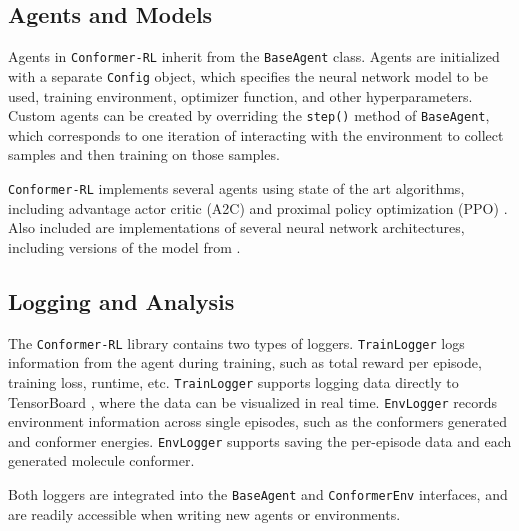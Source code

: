 \documentclass[twoside,11pt]{article}
\newcommand{\code}[1]{\texttt{#1}}
\newcommand{\titleofpaper}{Conformer-RL}
\newcommand{\genComment}[2]{\ifnum\comments=1{\color{#1}{\textsf{\footnotesize #2}}}\fi}
\newcommand{\josh}[1]{\genComment{purple}{[JK:#1]}}
\begin{document}

\subsection{Agents and Models}
Agents in \code{\titleofpaper} inherit from the \code{BaseAgent} class. Agents are initialized with a separate \code{Config} object, which specifies the neural network model to be used, training environment, optimizer function, and other hyperparameters. Custom agents can be created by overriding the \code{step()} method of \code{BaseAgent}, which corresponds to one iteration of interacting with the environment to collect samples and then training on those samples. 

\code{\titleofpaper} implements several agents using state of the art algorithms, including advantage actor critic (A2C) \citep{wu2017a2c} and proximal policy optimization (PPO) \citep{schulman2017ppo}. Also included are implementations of several neural network architectures, including versions of the model from \citep{gogineni2020torsionnet}.

\subsection{Logging and Analysis}
The \code{\titleofpaper} library contains two types of loggers. \code{TrainLogger} logs information from the agent during training, such as total reward per episode, training loss, runtime, etc. \code{TrainLogger} supports logging data directly to TensorBoard \citep{tensorflow2015-whitepaper}, where the data can be visualized in real time. \code{EnvLogger} records environment information across single episodes, such as the conformers generated and conformer energies. \code{EnvLogger} supports saving the per-episode data and each generated molecule conformer.

Both loggers are integrated into the \code{BaseAgent} and \code{ConformerEnv} interfaces, and are readily accessible when writing new agents or environments.
\end{document}
